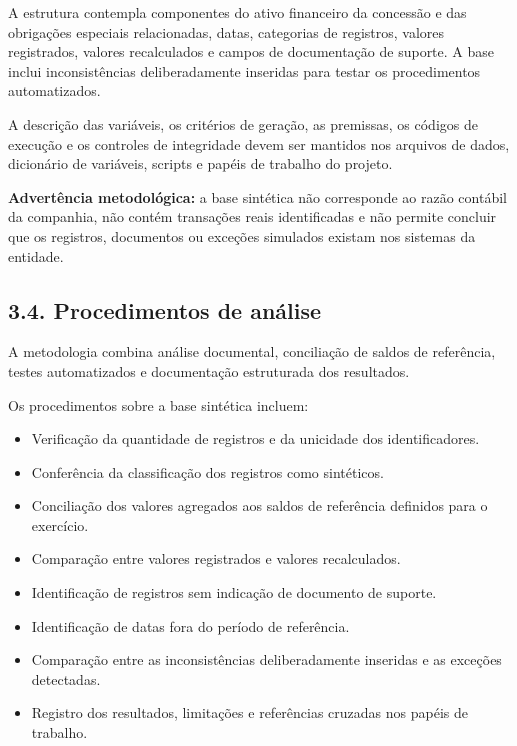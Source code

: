 \documentclass[
]{article}
\providecommand{\tightlist}{%
  \setlength{\itemsep}{0pt}\setlength{\parskip}{0pt}}
\begin{document}
A estrutura contempla componentes do ativo financeiro da concessão e das
obrigações especiais relacionadas, datas, categorias de registros,
valores registrados, valores recalculados e campos de documentação de
suporte. A base inclui inconsistências deliberadamente inseridas para
testar os procedimentos automatizados.

A descrição das variáveis, os critérios de geração, as premissas, os
códigos de execução e os controles de integridade devem ser mantidos nos
arquivos de dados, dicionário de variáveis, scripts e papéis de trabalho
do projeto.

\textbf{Advertência metodológica:} a base sintética não corresponde ao
razão contábil da companhia, não contém transações reais identificadas e
não permite concluir que os registros, documentos ou exceções simulados
existam nos sistemas da entidade.

\subsection{3.4. Procedimentos de
análise}\label{procedimentos-de-anuxe1lise}

A metodologia combina análise documental, conciliação de saldos de
referência, testes automatizados e documentação estruturada dos
resultados.

Os procedimentos sobre a base sintética incluem:

\begin{itemize}
\tightlist
\item
  Verificação da quantidade de registros e da unicidade dos
  identificadores.
\item
  Conferência da classificação dos registros como sintéticos.
\item
  Conciliação dos valores agregados aos saldos de referência definidos
  para o exercício.
\item
  Comparação entre valores registrados e valores recalculados.
\item
  Identificação de registros sem indicação de documento de suporte.
\item
  Identificação de datas fora do período de referência.
\item
  Comparação entre as inconsistências deliberadamente inseridas e as
  exceções detectadas.
\item
  Registro dos resultados, limitações e referências cruzadas nos papéis
  de trabalho.
\end{itemize}
\end{document}
